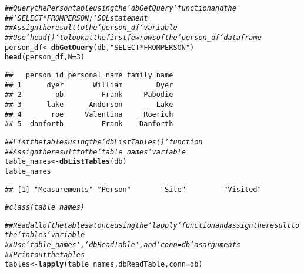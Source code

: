 \documentclass{article}\usepackage[]{graphicx}\usepackage[]{xcolor}
\makeatletter
\newcommand{\hlnum}[1]{\textcolor[rgb]{0.686,0.059,0.569}{#1}}%
\newcommand{\hlstr}[1]{\textcolor[rgb]{0.192,0.494,0.8}{#1}}%
\newcommand{\hlcom}[1]{\textcolor[rgb]{0.678,0.584,0.686}{\textit{#1}}}%
\newcommand{\hlstd}[1]{\textcolor[rgb]{0.345,0.345,0.345}{#1}}%
\newcommand{\hlkwb}[1]{\textcolor[rgb]{0.69,0.353,0.396}{#1}}%
\newcommand{\hlkwc}[1]{\textcolor[rgb]{0.333,0.667,0.333}{#1}}%
\newcommand{\hlkwd}[1]{\textcolor[rgb]{0.737,0.353,0.396}{\textbf{#1}}}%
\newenvironment{kframe}{%
 \def\at@end@of@kframe{}%
 \ifinner\ifhmode%
  \def\at@end@of@kframe{\end{minipage}}%
  \begin{minipage}{\columnwidth}%
 \fi\fi%
 \def\FrameCommand##1{\hskip\@totalleftmargin \hskip-\fboxsep
 \colorbox{shadecolor}{##1}\hskip-\fboxsep
     \hskip-\linewidth \hskip-\@totalleftmargin \hskip\columnwidth}%
 \MakeFramed {\advance\hsize-\width
   \@totalleftmargin\z@ \linewidth\hsize
   \@setminipage}}%
 {\par\unskip\endMakeFramed%
 \at@end@of@kframe}
\newenvironment{knitrout}{}{} %
\makeatother
\begin{document}
\begin{knitrout}
\begin{kframe}
\begin{alltt}
\hlcom{## Query the Person table using the `dbGetQuery` function and the}
\hlcom{## `SELECT * FROM PERSON;` SQL statement}
\hlcom{## Assign the result to the `person_df` variable}
\hlcom{## Use `head()` to look at the first few rows of the `person_df` dataframe}
\hlstd{person_df} \hlkwb{<-} \hlkwd{dbGetQuery}\hlstd{(db,} \hlstr{"SELECT * FROM PERSON"}\hlstd{)}
\hlkwd{head}\hlstd{(person_df,} \hlkwc{N} \hlstd{=} \hlnum{3}\hlstd{)}
\end{alltt}
\begin{verbatim}
##   person_id personal_name family_name
## 1      dyer       William        Dyer
## 2        pb         Frank     Pabodie
## 3      lake      Anderson        Lake
## 4       roe     Valentina     Roerich
## 5  danforth         Frank    Danforth
\end{verbatim}
\begin{alltt}
\hlcom{## List the tables using the `dbListTables()` function}
\hlcom{## Assign the result to the `table_names` variable}
\hlstd{table_names} \hlkwb{<-} \hlkwd{dbListTables}\hlstd{(db)}
\hlstd{table_names}
\end{alltt}
\begin{verbatim}
## [1] "Measurements" "Person"       "Site"         "Visited"
\end{verbatim}
\begin{alltt}
\hlcom{#class(table_names)}

\hlcom{## Read all of the tables at once using the `lapply` function and assign the result to the `tables` variable}
\hlcom{## Use `table_names`, `dbReadTable`, and `conn = db` as arguments}
\hlcom{## Print out the tables}
\hlstd{tables} \hlkwb{<-} \hlkwd{lapply}\hlstd{(table_names, dbReadTable,} \hlkwc{conn} \hlstd{= db)}
\end{alltt}



\end{kframe}
\end{knitrout}
\end{document}
